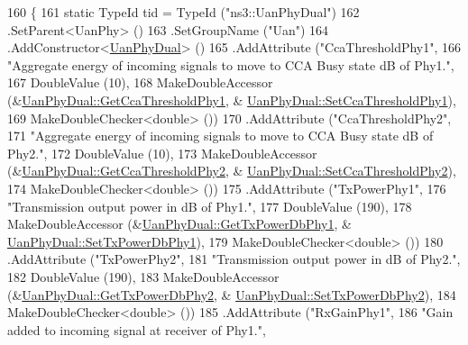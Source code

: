 \begin{DoxyCode}
160 \{
161   \textcolor{keyword}{static} TypeId tid = TypeId (\textcolor{stringliteral}{"ns3::UanPhyDual"})
162     .SetParent<UanPhy> ()
163     .SetGroupName (\textcolor{stringliteral}{"Uan"})
164     .AddConstructor<\hyperlink{classns3_1_1UanPhyDual_a98a7837a9c2c08c0851aafbca1d9179d}{UanPhyDual}> ()
165     .AddAttribute  (\textcolor{stringliteral}{"CcaThresholdPhy1"},
166                     \textcolor{stringliteral}{"Aggregate energy of incoming signals to move to CCA Busy state dB of Phy1."},
167                     DoubleValue (10),
168                     MakeDoubleAccessor (&\hyperlink{classns3_1_1UanPhyDual_a56c584e508c76f84527eca347a192313}{UanPhyDual::GetCcaThresholdPhy1}, &
      \hyperlink{classns3_1_1UanPhyDual_ad2bd673788abd93eb7c3f45cea08f3cf}{UanPhyDual::SetCcaThresholdPhy1}),
169                     MakeDoubleChecker<double> ())
170     .AddAttribute (\textcolor{stringliteral}{"CcaThresholdPhy2"},
171                    \textcolor{stringliteral}{"Aggregate energy of incoming signals to move to CCA Busy state dB of Phy2."},
172                    DoubleValue (10),
173                    MakeDoubleAccessor (&\hyperlink{classns3_1_1UanPhyDual_a4367de133e6bceab236c6888e71f3d66}{UanPhyDual::GetCcaThresholdPhy2}, &
      \hyperlink{classns3_1_1UanPhyDual_af2fecd3586f6a2579da091c2e811cb0e}{UanPhyDual::SetCcaThresholdPhy2}),
174                    MakeDoubleChecker<double> ())
175     .AddAttribute (\textcolor{stringliteral}{"TxPowerPhy1"},
176                    \textcolor{stringliteral}{"Transmission output power in dB of Phy1."},
177                    DoubleValue (190),
178                    MakeDoubleAccessor (&\hyperlink{classns3_1_1UanPhyDual_ad5c14dc1baed7a53bc6fe061688db62e}{UanPhyDual::GetTxPowerDbPhy1}, &
      \hyperlink{classns3_1_1UanPhyDual_a404ee2a8dc730f0f6a1c89097119c4c6}{UanPhyDual::SetTxPowerDbPhy1}),
179                    MakeDoubleChecker<double> ())
180     .AddAttribute (\textcolor{stringliteral}{"TxPowerPhy2"},
181                    \textcolor{stringliteral}{"Transmission output power in dB of Phy2."},
182                    DoubleValue (190),
183                    MakeDoubleAccessor (&\hyperlink{classns3_1_1UanPhyDual_ad065043640d6b4a0155d48fa13c68ea1}{UanPhyDual::GetTxPowerDbPhy2}, &
      \hyperlink{classns3_1_1UanPhyDual_aec0d6e6aca2f6fccd2954f43dd8fda56}{UanPhyDual::SetTxPowerDbPhy2}),
184                    MakeDoubleChecker<double> ())
185     .AddAttribute (\textcolor{stringliteral}{"RxGainPhy1"},
186                    \textcolor{stringliteral}{"Gain added to incoming signal at receiver of Phy1."},

\end{DoxyCode}
